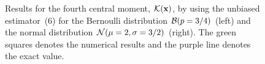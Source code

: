 \documentclass[a4paper]{article}
\begin{document}
\begin{figure}
  \begin{center}
  \end{center}
  \caption{Results for the fourth central moment, ${\cal K}({\bf x})$, by using the unbiased estimator~(6) for the Bernoulli distribution ${\cal B}(p=3/4)$ (left) and the normal distribution ${\cal N}(\mu=2,\sigma=3/2)$ (right). The green squares denotes the numerical results and the purple line denotes the exact value.}
\end{figure}
\end{document}
